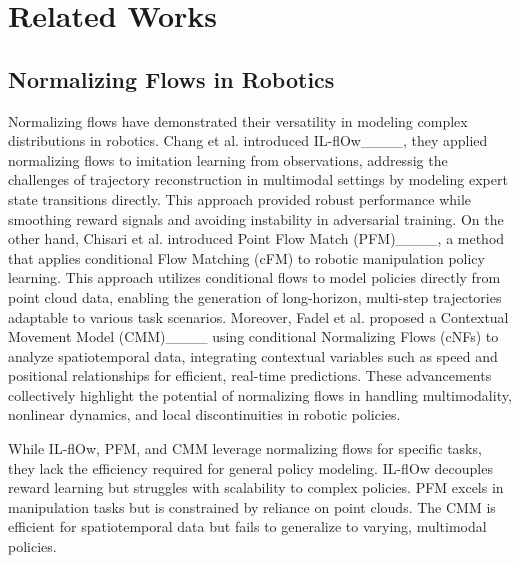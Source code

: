 \section{Related Works}
\label{section 2}
\subsection{Normalizing Flows in Robotics}

Normalizing flows have demonstrated their versatility in modeling complex distributions in robotics.
Chang et al. introduced IL-flOw____, they applied normalizing flows to imitation learning from observations, addressig the challenges of trajectory reconstruction in multimodal settings by modeling expert state transitions directly.
This approach provided robust performance while smoothing reward signals and avoiding instability in adversarial training.
On the other hand, Chisari et al. introduced Point Flow Match (PFM)____, a method that applies conditional Flow Matching (cFM) to robotic manipulation policy learning. This approach utilizes conditional flows to model policies directly from point cloud data, enabling the generation of long-horizon, multi-step trajectories adaptable to various task scenarios.
Moreover, Fadel et al. proposed a Contextual Movement Model (CMM)____ using conditional Normalizing Flows (cNFs) to analyze spatiotemporal data, integrating contextual variables such as speed and positional relationships for efficient, real-time predictions. These advancements collectively highlight the potential of normalizing flows in handling multimodality, nonlinear dynamics, and local discontinuities in robotic policies.

While IL-flOw, PFM, and CMM leverage normalizing flows for specific tasks, they lack the efficiency required for general policy modeling. IL-flOw decouples reward learning but struggles with scalability to complex policies. PFM excels in manipulation tasks but is constrained by reliance on point clouds. The CMM is efficient for spatiotemporal data but fails to generalize to varying, multimodal policies. 




